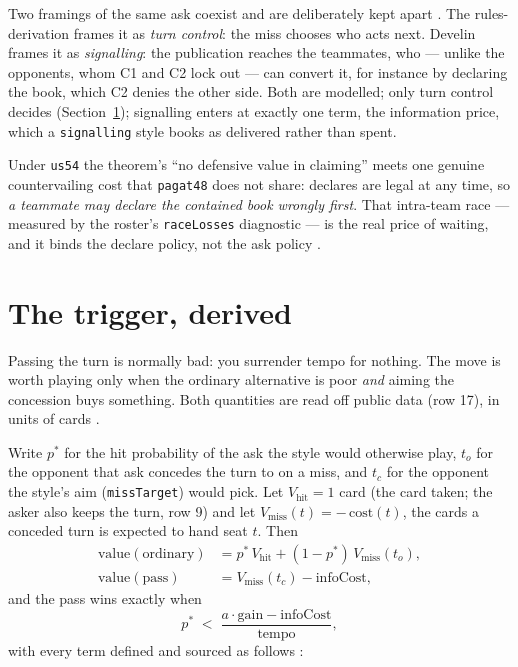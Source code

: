 \documentclass[11pt]{article}
\newcommand{\code}[1]{\texttt{#1}}
\begin{document}
Two framings of the same ask coexist and are deliberately kept apart
\cite{containment,styles}. The rules-derivation frames it as \emph{turn
control}: the miss chooses who acts next. Develin frames it as
\emph{signalling}: the publication reaches the teammates, who --- unlike the
opponents, whom C1 and C2 lock out --- can convert it, for instance by
declaring the book, which C2 denies the other side. Both are modelled; only
turn control decides (Section~\ref{sec:trigger}); signalling enters at exactly
one term, the information price, which a \code{signalling} style books as
delivered rather than spent.

Under \code{us54} the theorem's ``no defensive value in claiming'' meets one
genuine countervailing cost that \code{pagat48} does not share: declares are
legal at any time, so \emph{a teammate may declare the contained book wrongly
first}. That intra-team race --- measured by the roster's \code{raceLosses}
diagnostic --- is the real price of waiting, and it binds the declare policy,
not the ask policy \cite{containment}.

\section{The trigger, derived}
\label{sec:trigger}

Passing the turn is normally bad: you surrender tempo for nothing. The move is
worth playing only when the ordinary alternative is poor \emph{and} aiming the
concession buys something. Both quantities are read off public data (row 17),
in units of cards \cite{styles}.

Write $p^{*}$ for the hit probability of the ask the style would otherwise
play, $t_{o}$ for the opponent that ask concedes the turn to on a miss, and
$t_{c}$ for the opponent the style's aim (\code{missTarget}) would pick. Let
$V_{\mathrm{hit}} = 1$ card (the card taken; the asker also keeps the turn,
row 9) and let $V_{\mathrm{miss}}(t) = -\,\mathrm{cost}(t)$, the cards a
conceded turn is expected to hand seat $t$. Then
\begin{align*}
\mathrm{value}(\text{ordinary}) &= p^{*}\,V_{\mathrm{hit}}
   + (1-p^{*})\,V_{\mathrm{miss}}(t_{o}),\\
\mathrm{value}(\text{pass}) &= V_{\mathrm{miss}}(t_{c}) - \mathrm{infoCost},
\end{align*}
and the pass wins exactly when
\begin{equation}
\label{eq:trigger}
p^{*} \;<\; \frac{a \cdot \mathrm{gain} - \mathrm{infoCost}}{\mathrm{tempo}},
\end{equation}
with every term defined and sourced as follows \cite{styles}:
\end{document}
